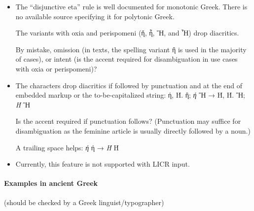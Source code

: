 \documentclass[a4paper]{article}
\newcommand*{\Greek}{\foreignlanguage{greek}}
\newcommand*{\Greek}{\ensuregreek}
\newcommand*{\TestUppercase}[1]{\Greek{#1 → \MakeUppercase{#1}}}
\begin{document}
\begin{itemize}

\item The ``disjunctive eta'' rule is well documented for monotonic Greek.
      There is no available source specifying it for polytonic Greek.

      The variants with oxia and perispomeni (ἤ, ἦ, Ἤ,
      and Ἦ) drop diacritics.

      By mistake, omission (in texts, the spelling variant ἢ is used in
      the majority of cases), or intent (is the accent required for
      disambiguation in use cases with oxia or perispomeni)?

\item The characters drop diacritics if followed by punctuation
      and at the end of embedded markup or the to-be-capitalized string:
      \TestUppercase{ή, Ή. ἢ; \emph{ή} Ἢ}

      Is the accent required if punctuation follows? (Punctuation may
      suffice for disambiguation as the feminine article is usually directly
      followed by a noun.)

      A trailing space helps: \TestUppercase{\emph{ή } ή }

\item Currently, this feature is not supported with LICR input.

\end{itemize}

\paragraph{Examples in ancient Greek}
(should be checked by a Greek linguist/typographer)

\end{document}
